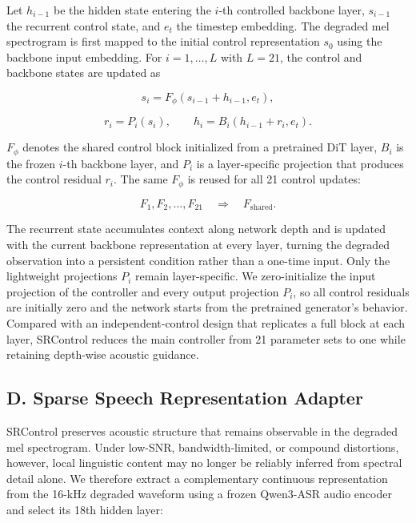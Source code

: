 \documentclass{article}
\begin{document}
Let $h_{i-1}$ be the hidden state entering the $i$-th controlled backbone layer, $s_{i-1}$ the recurrent control state, and $e_t$ the timestep embedding. The degraded mel spectrogram is first mapped to the initial control representation $s_0$ using the backbone input embedding. For $i=1,\ldots,L$ with $L=21$, the control and backbone states are updated as

\begin{equation}
  s_i=F_{\phi}\!\left(s_{i-1}+h_{i-1},e_t\right),
\end{equation}

\begin{equation}
  r_i=P_i(s_i),
  \qquad
  h_i=B_i\!\left(h_{i-1}+r_i,e_t\right).
\end{equation}

$F_{\phi}$ denotes the shared control block initialized from a pretrained DiT layer, $B_i$ is the frozen $i$-th backbone layer, and $P_i$ is a layer-specific projection that produces the control residual $r_i$. The same $F_{\phi}$ is reused for all 21 control updates:

\begin{equation}
  F_1,F_2,\ldots,F_{21}\quad\Longrightarrow\quad F_{\mathrm{shared}}.
\end{equation}

The recurrent state accumulates context along network depth and is updated with the current backbone representation at every layer, turning the degraded observation into a persistent condition rather than a one-time input. Only the lightweight projections $P_i$ remain layer-specific. We zero-initialize the input projection of the controller and every output projection $P_i$, so all control residuals are initially zero and the network starts from the pretrained generator's behavior. Compared with an independent-control design that replicates a full block at each layer, SRControl reduces the main controller from 21 parameter sets to one while retaining depth-wise acoustic guidance.

\subsection{D. Sparse Speech Representation Adapter}

SRControl preserves acoustic structure that remains observable in the degraded mel spectrogram. Under low-SNR, bandwidth-limited, or compound distortions, however, local linguistic content may no longer be reliably inferred from spectral detail alone. We therefore extract a complementary continuous representation from the 16-kHz degraded waveform using a frozen Qwen3-ASR audio encoder and select its 18th hidden layer:
\end{document}

